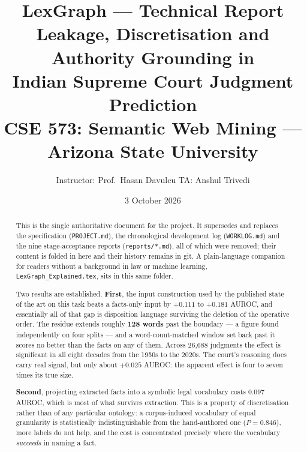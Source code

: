 \documentclass[12pt,a4paper]{article}
\title{\textbf{LexGraph --- Technical Report}\\[6pt]
\large Leakage, Discretisation and Authority Grounding in\\
Indian Supreme Court Judgment Prediction\\[10pt]
\normalsize CSE 573: Semantic Web Mining --- Arizona State University}
\author{Instructor: Prof.\ Hasan Davulcu \quad TA: Anshul Trivedi}
\date{3 October 2026}
\newcommand{\code}[1]{\texttt{\small #1}}
\begin{document}
\maketitle

\begin{abstract}
\noindent
This is the single authoritative document for the project. It supersedes and replaces the
specification (\code{PROJECT.md}), the chronological development log (\code{WORKLOG.md}) and the
nine stage-acceptance reports (\code{reports/*.md}), all of which were removed; their content is
folded in here and their history remains in git. A plain-language companion for readers without a
background in law or machine learning, \code{LexGraph\_Explained.tex}, sits in this same folder.

Two results are established. \textbf{First}, the input construction used by the published state of
the art on this task beats a facts-only input by $+0.111$ to $+0.181$ AUROC, and essentially all of
that gap is disposition language surviving the deletion of the operative order. The residue extends
roughly \textbf{128 words} past the boundary --- a figure found independently on four splits --- and
a word-count-matched window set back past it scores no better than the facts on any of them. Across
26,688 judgments the effect is significant in all eight decades from the 1950s to the 2020s. The
court's reasoning does carry real signal, but only about $+0.025$ AUROC: the apparent effect is four
to seven times its true size.

\textbf{Second}, projecting extracted facts into a symbolic legal vocabulary costs $0.097$ AUROC,
which is most of what survives extraction. This is a property of discretisation rather than of any
particular ontology: a corpus-induced vocabulary of equal granularity is statistically
indistinguishable from the hand-authored one ($P=0.846$), more labels do not help, and the cost is
concentrated precisely where the vocabulary \emph{succeeds} in naming a fact.


\end{abstract}
\end{document}
